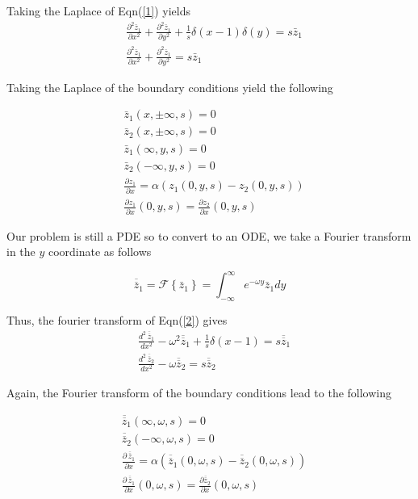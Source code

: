 \documentclass[10pt,a4,fleqn]{article}
\newcommand*{\rttensor}[1]{\overline{\overline{#1}}}
\begin{document}
Taking the Laplace of Eqn(\ref{1}) yields 
\begin{equation}\label{2}
\begin{aligned}
    &\frac{\partial^2 \bar{z}_1}{\partial x^2} + \frac{\partial^2 \bar{z}_1}{\partial y^2} +  \frac{1}{s}\delta (x -1) \delta (y) = s\bar{z}_1\\
    &\frac{\partial^2 \bar{z}_1}{\partial x^2} + \frac{\partial^2 \bar{z}_1}{\partial y^2} = s\bar{z}_1    
\end{aligned}
\end{equation}

Taking the Laplace of the boundary conditions yield the following

\begin{equation}
\begin{aligned}
    &\bar{z}_1(x, \pm \infty, s) = 0\\
    &\bar{z}_2(x, \pm \infty, s) = 0\\
    &\bar{z}_1(\infty, y, s) = 0\\
    &\bar{z}_2(-\infty, y, s) = 0\\
    &\frac{\partial z_1}{\partial x} = \alpha \left( z_1\left(0,y, s\right) - z_2\left(0,y,s\right)\right)\\
    &\frac{\partial z_1}{\partial x}(0, y, s) = \frac{\partial z_2}{\partial x}(0,y,s)
\end{aligned}
\end{equation}

Our problem is still a PDE so to convert to an ODE, we take a Fourier transform in the $y$ coordinate as follows

\[\rttensor{z}_1 = \mathcal{F}\left\{\bar{z}_1\right\}  = \int_{-\infty}^{\infty} e^{-\omega y}\bar{z}_1 dy \]

Thus, the fourier transform of Eqn(\ref{2}) gives
\begin{equation}
    \begin{aligned}
    &\frac{d^2\,\rttensor{z}_1}{dx^2} - \omega^2 \rttensor{z}_1 + \frac{1}{s}\delta\left(x - 1\right) = s\rttensor{z}_1\\
    &\frac{d^2\,\rttensor{z}_2}{dx^2} - \omega \rttensor{z}_2 = s\rttensor{z}_2
    \end{aligned}
\end{equation}

Again, the Fourier transform of the boundary conditions lead to the following

\begin{equation}
\begin{aligned}
    &\rttensor{z}_1(\infty, \omega, s) = 0\\
    &\rttensor{z}_2(-\infty, \omega, s) = 0\\
    &\frac{\partial\, \rttensor{z}_1}{\partial x} = \alpha \left( \rttensor{z}_1\left(0,\omega, s\right) - \rttensor {z}_2\left(0,\omega,s\right)\right)\\
    &\frac{\partial\, \rttensor {z}_1}{\partial x}(0, \omega, s) = \frac{\partial \rttensor {z}_2}{\partial x}(0,\omega,s)
\end{aligned}
\end{equation}
\end{document}
